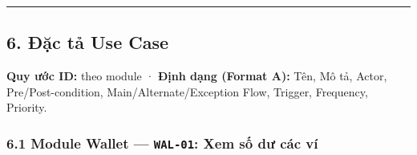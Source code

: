 \documentclass[11pt,a4paper]{article}
\begin{document}
\begin{center}\rule{1.0\linewidth}{0.5pt}\end{center}

\subsection{6. Đặc tả Use Case}\label{ux111ux1eb7c-tux1ea3-use-case}

\textbf{Quy ước ID:} theo module · \textbf{Định dạng (Format A):} Tên,
Mô tả, Actor, Pre/Post-condition, Main/Alternate/Exception Flow,
Trigger, Frequency, Priority.

\subsubsection{\texorpdfstring{6.1 Module Wallet --- \texttt{WAL-01}: Xem số dư các ví}{6.1 Module Wallet --- WAL-01: Xem số dư các ví}}\label{module-wallet-wal-01-xem-sux1ed1-dux1b0-cuxe1c-vuxed}
\end{document}
